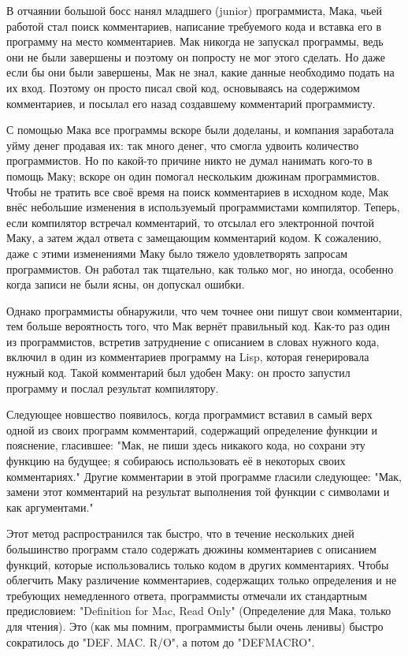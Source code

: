 В отчаянии большой босс нанял младшего (junior) программиста, Мака, чьей работой стал
поиск комментариев, написание требуемого кода и вставка его в программу на место
комментариев. Мак никогда не запускал программы, ведь они не были завершены и поэтому он
попросту не мог этого сделать. Но даже если бы они были завершены, Мак не знал, какие
данные необходимо подать на их вход. Поэтому он просто писал свой код, основываясь на
содержимом комментариев, и посылал его назад создавшему комментарий программисту.

С помощью Мака все программы вскоре были доделаны, и компания заработала уйму денег
продавая их: так много денег, что смогла удвоить количество программистов. Но по какой-то
причине никто не думал нанимать кого-то в помощь Маку; вскоре он один помогал нескольким
дюжинам программистов. Чтобы не тратить все своё время на поиск комментариев в исходном
коде, Мак внёс небольшие изменения в используемый программистами компилятор. Теперь, если
компилятор встречал комментарий, то отсылал его электронной почтой Маку, а затем ждал
ответа с замещающим комментарий кодом. К сожалению, даже с этими изменениями Маку было
тяжело удовлетворять запросам программистов. Он работал так тщательно, как только мог, но
иногда, особенно когда записи не были ясны, он допускал ошибки.

Однако программисты обнаружили, что чем точнее они пишут свои комментарии, тем больше
вероятность того, что Мак вернёт правильный код. Как-то раз один из программистов,
встретив затруднение с описанием в словах нужного кода, включил в один из комментариев
программу на Lisp, которая генерировала нужный код. Такой комментарий был удобен Маку: он
просто запустил программу и послал результат компилятору.

Следующее новшество появилось, когда программист вставил в самый верх одной из своих
программ комментарий, содержащий определение функции и пояснение, гласившее: "Мак, не пиши
здесь никакого кода, но сохрани эту функцию на будущее; я собираюсь использовать её в
некоторых своих комментариях." Другие комментарии в этой программе гласили следующее:
"Мак, замени этот комментарий на результат выполнения той функции с символами  и
 как аргументами."

Этот метод распространился так быстро, что в течение нескольких дней большинство программ
стало содержать дюжины комментариев с описанием функций, которые использовались только
кодом в других комментариях. Чтобы облегчить Маку различение комментариев, содержащих
только определения и не требующих немедленного ответа, программисты отмечали их
стандартным предисловием: "Definition for Mac, Read Only" (Определение для Мака, только
для чтения). Это (как мы помним, программисты были очень ленивы) быстро сократилось до
"DEF. MAC. R/O", а потом до "DEFMACRO".

